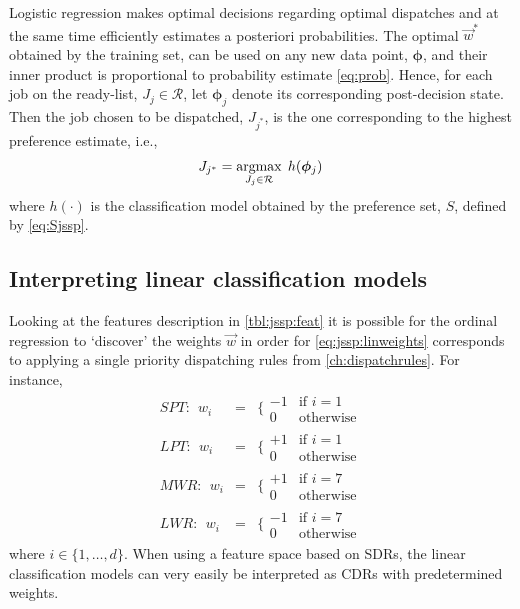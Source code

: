 \documentclass[smallextended]{svjour3}
\renewcommand{\vphi}{\bm \phi}
\begin{document}
	Logistic regression makes optimal decisions regarding optimal dispatches and at the same time efficiently estimates a posteriori probabilities. The optimal $\vec{w}^*$ obtained by the training set, can be used on any new data point, $\vphi$, and their inner product is proportional to probability estimate \eqref{eq:prob}. Hence, for each job on the ready-list, $J_j\in\mathcal{R}$, let $\vphi_j$ denote its corresponding  post-decision state. Then the job chosen to be dispatched, $J_{j^*}$, is the one corresponding to the highest preference estimate, i.e.,
	\begin{equation}\label{eq:lin}
	J_{j^*}=\argmax_{J_j\in \mathcal{R}}\; h(\vphi_j)
	\end{equation}
	where $h(\cdot)$ is the classification model obtained by the preference set, $S$, defined by \eqref{eq:Sjssp}. 
	
	\subsection{Interpreting linear classification models}\label{sec:learningmodels:interpret}
	Looking at the features description in \cref{tbl:jssp:feat} it is possible for the ordinal regression to `discover' the weights $\vec{w}$ in order for \eqref{eq:jssp:linweights} corresponds to applying a single priority dispatching rules from \cref{ch:dispatchrules}. For instance, 
	\begin{eqnarray*} %
		SPT:~~w_i&=&\bigg\{ \begin{array}{rl}-1&\text{if }i=1\\0&\text{otherwise}\end{array} \\
		LPT:~~w_i&=&\bigg\{ \begin{array}{rl}+1&\text{if }i=1\\0&\text{otherwise}\end{array} \\
		MWR:~~w_i&=&\bigg\{ \begin{array}{rl}+1&\text{if }i=7\\0&\text{otherwise}\end{array} \\
		LWR:~~w_i&=&\bigg\{ \begin{array}{rl}-1&\text{if }i=7\\0&\text{otherwise}\end{array}
	\end{eqnarray*}
	where $i\in\{1,\ldots,d\}$. %
	When using a feature space based on SDRs, the linear classification models can very easily be interpreted as CDRs with predetermined weights.
	
\end{document}

